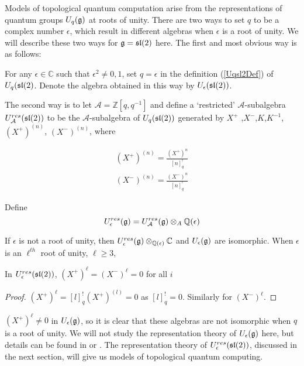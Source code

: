 Models of topological quantum computation arise from the representations of
quantum groups $U_q(\mathfrak{g})$ at roots of unity. There are two ways to set $q$ to
be a complex  number  $\epsilon$, which result in different algebras when
$\epsilon$ is a root of unity. We will describe these two ways for $\mathfrak{g} =
\mathfrak{sl}(2)$ here. The first and most obvious way is as follows: 

For any $\epsilon \in \mathbb{C}$ such that $\epsilon ^2 \neq 0,1$, set $q =
\epsilon$ in the definition (\ref{Uqsl2Def}) of $U_q(\mathfrak{sl}(2)$. Denote the
algebra obtained in this way by $U_\epsilon(\mathfrak{sl}(2))$. 

The second way is to let $\mathcal{A} = \mathbb{Z}[q,q^{-1}]$ and define a
`restricted' $\mathcal{A}$-subalgebra $U_\mathcal{A}^{res}(\mathfrak{sl}(2))$ to be the
$\mathcal{A}$-subalgebra of $U_q(\mathfrak{sl}(2))$ generated by $ X^+$ ,$X^-$,$K$,$K^{-1}$, $(X^+) ^{(n)}$,
$(X^-)^{(n)}$, where


\begin{align}
     (X^+)^{(n)} = \frac{ (X^+)^n}{[n]^!_{q}} \\
    (X^-)^{(n)} = \frac{(X^-)^n}{[n]^!_{q}} 
\end{align}


Define 
\begin{equation}
    U_\epsilon^{res}(\mathfrak{g}) = U_\mathcal{A}^{res}(\mathfrak{g}) \otimes_A \mathbb{Q}(\epsilon)
\end{equation}

If $\epsilon$ is not a root of unity, then $U_\epsilon^{res}(\mathfrak{g})
\otimes_{\mathbb{Q}(\epsilon)} \mathbb{C}$ and $U_\epsilon(\mathfrak{g})$ are
isomorphic. When $\epsilon$ is an $\ell^{th}$ root of unity, $\ell \geq 3$,

\begin{lemma}
    In $U_\epsilon^{res}(\mathfrak{sl}(2))$, $ (X^+)^\ell = (X^-)^\ell = 0$ for all $i$
\end{lemma}
\begin{proof}
    $ (X^+)^\ell = [l]_{q}^!  (X^+)^{(l)} = 0$ as $[l]_{q}^! = 0$. Similarly for $(X^-)^\ell$.
\end{proof}

$(X^+)^\ell \neq 0$ in $U_\epsilon(\mathfrak{g})$, so it is clear that these algebras
are not isomorphic when $q$ is a root of unity. We will not study the
representation theory of $U_\epsilon(\mathfrak{g})$ here, but details can be found in
\cite{Kassel1994} or \cite{Jantzen1995}. The representation theory of
$U_\epsilon^{res}(\mathfrak{sl}(2))$, discussed in the next section, will give us models
of topological quantum computing. 

